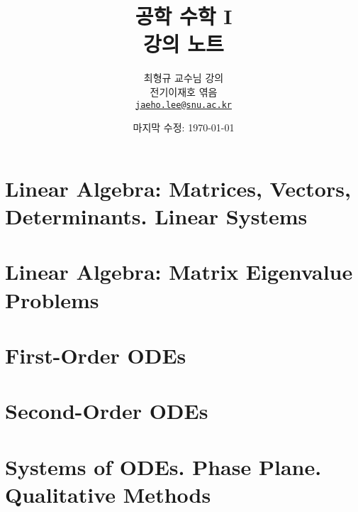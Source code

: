 \documentclass[oneside,a4paper,microtype]{oblivoir}
\title{공학 수학 I\\강의 노트}
\author{최형규 교수님 강의\vspace{0.3cm}\\전기\textperiodcentered정보공학부 이재호 엮음\\\href{mailto:jaeho.lee@snu.ac.kr}{\texttt{jaeho.lee@snu.ac.kr}}}
\date{마지막 수정: \today}
\theoremstyle{definition}
\theoremstyle{plain}
\theoremstyle{plain}
\theoremstyle{remark}
\theoremstyle{remark}
\theoremstyle{remark}
\theoremstyle{remark}
\begin{document}
\maketitle

\setcounter{section}{6}
\reversemarginpar{}
\section{Linear Algebra: Matrices, Vectors, Determinants. Linear Systems}


\section{Linear Algebra: Matrix Eigenvalue Problems}


\setcounter{section}{0}
\section{First-Order ODEs}


\section{Second-Order ODEs}


\setcounter{section}{3}
\section{Systems of ODEs. Phase Plane. Qualitative Methods}

\end{document}
